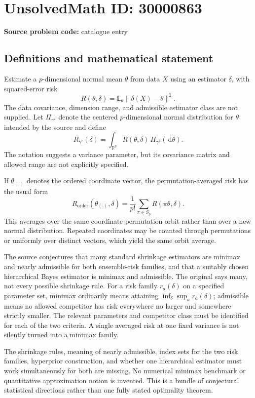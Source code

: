 \documentclass[11pt]{article}
\newcommand{\R}{\mathbb{R}}
\newcommand{\E}{\mathbb{E}}
\newcommand{\dd}{\,\mathrm{d}}
\begin{document}
\section*{UnsolvedMath ID: 30000863}
\textbf{Source problem code:} catalogue entry
\subsection{Definitions and mathematical statement}
Estimate a $p$-dimensional normal mean $\theta$ from data $X$ using an estimator $\delta$, with squared-error risk
\[
 R(\theta,\delta)=\E_\theta\|\delta(X)-\theta\|^2.
\]
The data covariance, dimension range, and admissible estimator class are not supplied. Let $\Pi_{\gamma^2}$ denote the centered $p$-dimensional normal distribution for $\theta$ intended by the source and define
\[
 R_{\gamma^2}(\delta)=\int_{\R^p}R(\theta,\delta)\,\Pi_{\gamma^2}(\dd\theta).
\]
The notation suggests a variance parameter, but its covariance matrix and allowed range are not explicitly specified.

If $\theta_{(\cdot)}$ denotes the ordered coordinate vector, the permutation-averaged risk has the usual form
\[
 R_{\mathrm{order}}(\theta_{(\cdot)},\delta)
 =\frac1{p!}\sum_{\pi\in S_p}R(\pi\theta,\delta).
\]
This averages over the same coordinate-permutation orbit rather than over a new normal distribution. Repeated coordinates may be counted through permutations or uniformly over distinct vectors, which yield the same orbit average.

The source conjectures that many standard shrinkage estimators are minimax and nearly admissible for both ensemble-risk families, and that a suitably chosen hierarchical Bayes estimator is minimax and admissible. The original says many, not every possible shrinkage rule. For a risk family $r_a(\delta)$ on a specified parameter set, minimax ordinarily means attaining $\inf_\delta\sup_a r_a(\delta)$; admissible means no allowed competitor has risk everywhere no larger and somewhere strictly smaller. The relevant parameters and competitor class must be identified for each of the two criteria. A single averaged risk at one fixed variance is not silently turned into a minimax family.

The shrinkage rules, meaning of nearly admissible, index sets for the two risk families, hyperprior construction, and whether one hierarchical estimator must work simultaneously for both are missing. No numerical minimax benchmark or quantitative approximation notion is invented. This is a bundle of conjectural statistical directions rather than one fully stated optimality theorem.
\end{document}
